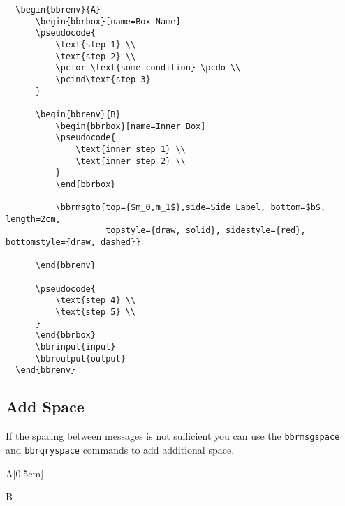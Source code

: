 \documentclass[a4paper]{report}
\begin{document}
  \begin{lstlisting}
  \begin{bbrenv}{A}
	  \begin{bbrbox}[name=Box Name]
	  \pseudocode{
		  \text{step 1} \\
		  \text{step 2} \\
		  \pcfor \text{some condition} \pcdo \\
		  \pcind\text{step 3} 
	  }
  
	  \begin{bbrenv}{B}
		  \begin{bbrbox}[name=Inner Box]
		  \pseudocode{
			  \text{inner step 1} \\
			  \text{inner step 2} \\
		  }
		  \end{bbrbox}
		  
		  \bbrmsgto{top={$m_0,m_1$},side=Side Label, bottom=$b$, length=2cm,
					topstyle={draw, solid}, sidestyle={red}, bottomstyle={draw, dashed}}
  
	  \end{bbrenv}
  
	  \pseudocode{
		  \text{step 4} \\
		  \text{step 5} \\
	  }
	  \end{bbrbox}
	  \bbrinput{input}
	  \bbroutput{output}
  \end{bbrenv}
  \end{lstlisting}
  
  
  \subsection{Add Space}
  If the spacing between messages is not sufficient you can use the \lstinline$bbrmsgspace$ and
  \lstinline$bbrqryspace$ commands to add additional space.
  
  \begin{bbrenv}[1cm]{A}[0.5cm]
	  \begin{bbrbox}[name=Reduction]
  
	  \begin{bbrenv}{B}
  
		  \begin{bbrbox}[name=Adversary,minheight=3cm,xshift=4cm]
  
		  \end{bbrbox}
		  
		  \bbrmsgspace{1.5cm}
  
		  \bbrqryspace{1cm}
  
	  \end{bbrenv}
  
	  \end{bbrbox}
  \end{bbrenv}
  
\end{document}
